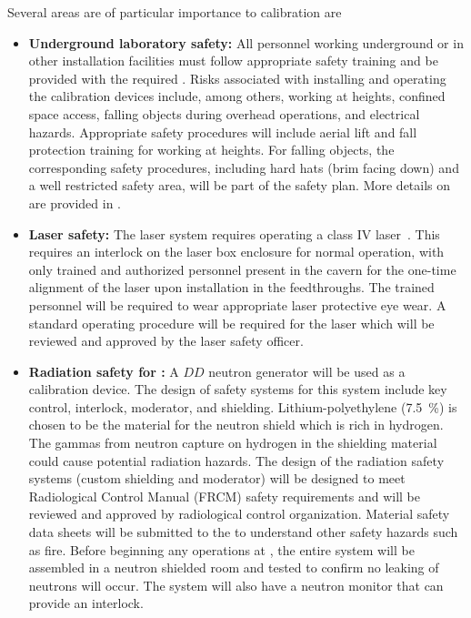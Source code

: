 Several areas are of particular importance to calibration are
\begin{itemize}
\item {\bf Underground laboratory safety:} All personnel working underground or in other installation facilities must follow appropriate safety training and be provided with the required . Risks associated with installing and operating the calibration devices include, among others, working at heights, confined space access, falling objects during overhead operations, and electrical hazards. Appropriate safety procedures will include aerial lift and fall protection training for working at heights. For falling objects, the corresponding safety procedures, including hard hats (brim facing down) and a well restricted safety area, will be part of the safety plan. More details on  are provided in  \tcchesh.

\item {\bf Laser safety:} The laser system requires operating a class IV laser~\cite{FNAL:Class4Lasers,CERN:Class4Lasers}. This requires an interlock on the laser box enclosure for normal operation, with only trained and authorized personnel present in the cavern for the one-time alignment of the laser upon installation in the feedthroughs. The trained personnel will be required to wear appropriate laser protective eye wear. A standard operating procedure will be required for the laser which will be reviewed and approved by the  laser safety officer. 

\item {\bf Radiation safety for :} A $DD$ neutron generator will be used as a calibration device. The design of safety systems for this system include key control, interlock, moderator, and shielding. Lithium-polyethylene (\SI{7.5}{\%}) is chosen to be the material for the neutron shield which is rich in hydrogen. The gammas from neutron capture on hydrogen in the shielding material could cause potential radiation hazards. The design of the radiation safety systems (custom shielding and moderator) will be designed to meet  Radiological Control Manual (FRCM) safety requirements and will be reviewed and approved by  radiological control organization. Material safety data sheets will be submitted to the   to understand other safety hazards such as fire. Before beginning any operations at , the entire system will be assembled in a neutron shielded room and tested to confirm no leaking of neutrons will occur. The system will also have a neutron monitor that can provide an interlock. 



\end{itemize}
